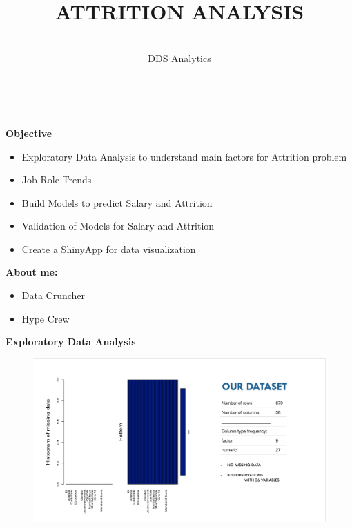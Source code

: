 \documentclass[notes,11pt]{beamer}
\title [DDSAnalytics]{ATTRITION ANALYSIS}
\author[H. H. NGUYEN] 
{{\sc{Huy Hoang Nguyen}}\\[5pt]
DDS Analytics
 }
\date {}
\institute[SMU]
\begin{document}
\frame{

\titlepage
}




\begin{frame}
${}$\\
\begin{center}
\textbf{\color{blue}\Large{Objective}}
\end{center}\medskip

\begin{itemize}
\item<1-> Exploratory Data Analysis  to understand main factors  for Attrition problem
\item<2-> Job Role Trends
\item<3-> Build Models to predict  Salary and Attrition 
\item<4-> Validation of Models for Salary and Attrition 
\item<5-> Create a ShinyApp for data visualization

\end{itemize}

\end{frame}

\begin{frame}
\textbf{\color{blue}\large{About me:}} 
\begin{itemize}
\item<1-> Data Cruncher
\item<1-> Hype Crew
\end{itemize}
\end{frame}



\begin{frame}
\begin{center}
\textbf{\color{blue}\Large{Exploratory Data Analysis}}
\end{center}\medskip

\begin{figure}
\includegraphics[scale=0.4]{PIC1}
\end{figure}

\end{frame}
\end{document}
